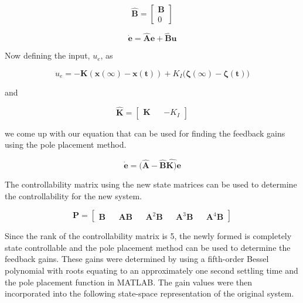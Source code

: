 \documentclass[titlepage]{article}
\begin{document}
\begin{equation}
    \mathbf{\hat{B}} = 
    \begin{bmatrix}
        \textbf{B}\\
        0
    \end{bmatrix}
\end{equation}

\begin{equation}
    \mathbf{\dot e} = \mathbf{\hat{A}e} + \mathbf{\hat{B}u}
\end{equation}

Now defining the input, $u_e$, as

\begin{equation}
    u_{e} = \mathbf{-K(x(\infty) - x(t))} + K_{I}(\mathbf{\zeta(\infty)-\zeta(t))}
\end{equation}

and

\begin{equation}
    \mathbf{\hat{K}} = 
    \begin{bmatrix}
        \textbf{K} && -K_{I}
    \end{bmatrix}
\end{equation}

we come up with our equation that can be used for finding the feedback gains using the pole placement method.

\begin{equation}
    \mathbf{\dot e} = \mathbf{(\hat{A}-\hat{B}\hat{K)}e}
\end{equation}

The controllability matrix using the new state matrices can be used to determine the controllability for the new system.

\begin{equation}
    \textbf{P} = 
    \begin{bmatrix}
        \textbf{B} && \textbf{AB} && \textbf{A}^2\textbf{B} && \textbf{A}^3\textbf{B} && \textbf{A}^4\textbf{B}
    \end{bmatrix}
\end{equation}

Since the rank of the controllability matrix is 5, the newly formed is completely state controllable and the pole placement method can be used to determine the feedback gains. These gains were determined by using a fifth-order Bessel polynomial with roots equating to an approximately one second settling time and the pole placement function in MATLAB. The gain values were then incorporated into the following state-space representation of the original system.
\end{document}
